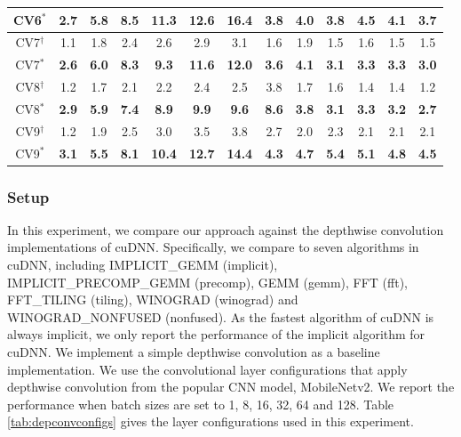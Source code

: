 \begin{table}[]
\begin{threeparttable}
\begin{tabular}{c|cccccc|cccccc}
CV6$^{*}$&\textbf{2.7} &\textbf{5.8} &\textbf{8.5} &\textbf{11.3} &\textbf{12.6} &\textbf{16.4} &\textbf{3.8} &\textbf{4.0} &\textbf{3.8} &\textbf{4.5} &\textbf{4.1} &\textbf{3.7} \\
\hline
CV7$^{\dag}$&1.1 &1.8 &2.4 &2.6 &2.9 &3.1 &1.6 &1.9 &1.5 &1.6 &1.5 &1.5 \\
CV7$^{*}$&\textbf{2.6} &\textbf{6.0} &\textbf{8.3} &\textbf{9.3} &\textbf{11.6} &\textbf{12.0} &\textbf{3.6} &\textbf{4.1} &\textbf{3.1} &\textbf{3.3} &\textbf{3.3} &\textbf{3.0} \\
\hline
CV8$^{\dag}$&1.2 &1.7 &2.1 &2.2 &2.4 &2.5 &3.8 &1.7 &1.6 &1.4 &1.4 &1.2 \\
CV8$^{*}$&\textbf{2.9} &\textbf{5.9} &\textbf{7.4} &\textbf{8.9} &\textbf{9.9} &\textbf{9.6} &\textbf{8.6} &\textbf{3.8} &\textbf{3.1} &\textbf{3.3} &\textbf{3.2} &\textbf{2.7} \\
\hline
CV9$^{\dag}$&1.2 &1.9 &2.5 &3.0 &3.5 &3.8 &2.7 &2.0 &2.3 &2.1 &2.1 &2.1 \\
CV9$^{*}$&\textbf{3.1} &\textbf{5.5} &\textbf{8.1} &\textbf{10.4} &\textbf{12.7} &\textbf{14.4} &\textbf{4.3} &\textbf{4.7} &\textbf{5.4} &\textbf{5.1} &\textbf{4.8} &\textbf{4.5} \\\bottomrule
\end{tabular}
\end{threeparttable}
\end{table}

%	
%


\subsubsection{Setup} In this experiment, we compare our approach against the depthwise convolution implementations of cuDNN. Specifically, we compare to seven algorithms in cuDNN, including IMPLICIT\_GEMM (implicit), IMPLICIT\_PRECOMP\_GEMM (precomp), GEMM (gemm), FFT (fft), FFT\_TILING (tiling), WINOGRAD (winograd) and WINOGRAD\_NONFUSED (nonfused). 
As the fastest algorithm of cuDNN is always implicit, we only report the performance of the implicit algorithm for cuDNN. 
We implement a simple depthwise convolution as a baseline implementation. 
We use the convolutional layer configurations that apply depthwise convolution from the popular CNN model, MobileNetv2. 
We report the performance when batch sizes are set to 1, 8, 16, 32, 64 and 128. 
Table \ref{tab:depconvconfigs} gives the layer configurations used in this experiment.

